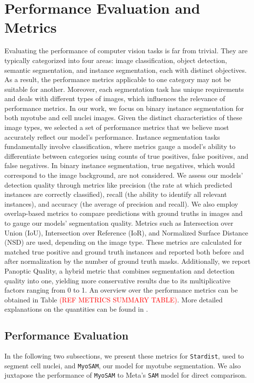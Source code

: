 \section{Performance Evaluation and Metrics}\label{secperformance}
Evaluating the performance of computer vision tasks is far from trivial. They are typically categorized into four areas: image classification, object detection, semantic segmentation, and instance segmentation, each with distinct objectives. As a result, the performance metrics applicable to one category may not be suitable for another. Moreover, each segmentation task has unique requirements and deals with different types of images, which influences the relevance of performance metrics. In our work, we focus on binary instance segmentation for both myotube and cell nuclei images. Given the distinct characteristics of these image types, we selected a set of performance metrics that we believe most accurately reflect our model's performance.
Instance segmentation tasks fundamentally involve classification, where metrics gauge a model's ability to differentiate between categories using counts of true positives, false positives, and false negatives. In binary instance segmentation, true negatives, which would correspond to the image background, are not considered. We assess our models' detection quality through metrics like precision (the rate at which predicted instances are correctly classified), recall (the ability to identify all relevant instances), and accuracy (the average of precision and recall). We also employ overlap-based metrics to compare predictions with ground truths in images and to gauge our models' segmentation quality. Metrics such as Intersection over Union (IoU), Intersection over Reference (IoR), and Normalized Surface Distance (NSD) are used, depending on the image type. These metrics are calculated for matched true positive and ground truth instances and reported both before and after normalization by the number of ground truth masks. Additionally, we report Panoptic Quality, a hybrid metric that combines segmentation and detection quality into one, yielding more conservative results due to its multiplicative factors ranging from 0 to 1. An overview over the performance metrics can be obtained in Table \textcolor{red}{(REF METRICS SUMMARY TABLE)}. More detailed explanations on the quantities can be found in \cite{metricsreloaded}.


\subsection{Performance Evaluation}
In the following two subsections, we present these metrics for \texttt{Stardist}, used to segment cell nuclei, and \texttt{MyoSAM}, our model for myotube segmentation. We also juxtapose the performance of \texttt{MyoSAM} to Meta’s \texttt{SAM} model for direct comparison.
